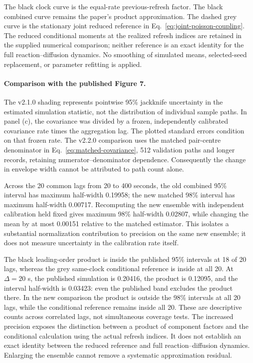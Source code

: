 \documentclass[11pt]{article}
\begin{document}
The black clock curve is the equal-rate previous-refresh factor. The black combined curve remains the paper's product approximation. The dashed grey curve is the stationary joint reduced reference in Eq.~\eqref{eq:joint-poisson-coupling}. The reduced conditional moments at the realized refresh indices are retained in the supplied numerical comparison; neither reference is an exact identity for the full reaction--diffusion dynamics. No smoothing of simulated means, selected-seed replacement, or parameter refitting is applied.



\paragraph{Comparison with the published Figure 7.}
The v2.1.0 shading represents pointwise 95\% jackknife uncertainty in the estimated simulation statistic, not the distribution of individual sample paths. In panel (c), the covariance was divided by a frozen, independently calibrated covariance rate times the aggregation lag. The plotted standard errors condition on that frozen rate. The v2.2.0 comparison uses the matched pair-centre denominator in Eq.~\eqref{eq:matched-covariance}, 512 validation paths and longer records, retaining numerator--denominator dependence. Consequently the change in envelope width cannot be attributed to path count alone.

Across the 20 common lags from 20 to 400 seconds, the old combined 95\% interval has maximum half-width 0.19958; the new matched 98\% interval has maximum half-width 0.00717. Recomputing the new ensemble with independent calibration held fixed gives maximum 98\% half-width 0.02807, while changing the mean by at most 0.00151 relative to the matched estimator. This isolates a substantial normalization contribution to precision on the same new ensemble; it does not measure uncertainty in the calibration rate itself.

The black leading-order product is inside the published 95\% intervals at 18 of 20 lags, whereas the grey same-clock conditional reference is inside at all 20. At $\Delta=20$ s, the published simulation is 0.20416, the product is 0.12095, and the interval half-width is 0.03423: even the published band excludes the product there. In the new comparison the product is outside the 98\% intervals at all 20 lags, while the conditional reference remains inside all 20. These are descriptive counts across correlated lags, not simultaneous coverage tests. The increased precision exposes the distinction between a product of component factors and the conditional calculation using the actual refresh indices. It does not establish an exact identity between the reduced reference and full reaction--diffusion dynamics. Enlarging the ensemble cannot remove a systematic approximation residual.
\end{document}
